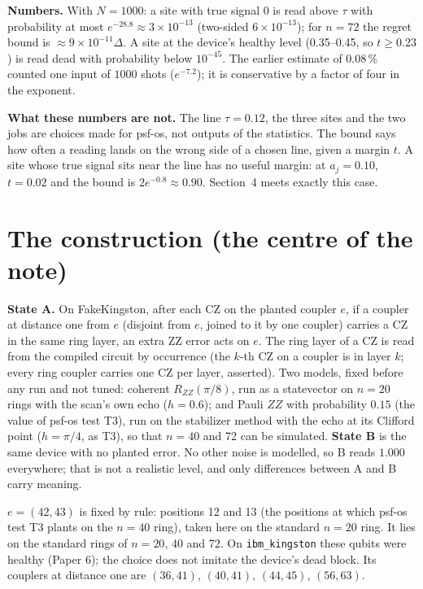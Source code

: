 \documentclass[10pt,a4paper]{article}
\theoremstyle{definition}
\theoremstyle{remark}
\begin{document}
\textbf{Numbers.} With $N=1000$: a site with true signal $0$ is read above $\tau$ with probability at most
$e^{-28.8}\approx3\times10^{-13}$ (two-sided $6\times10^{-13}$); for $n=72$ the regret bound is
$\approx9\times10^{-11}\Delta$. A site at the device's healthy level (0.35--0.45, so $t\ge0.23$) is read dead with
probability below $10^{-45}$. The earlier estimate of $0.08\,\%$ counted one input of $1000$ shots ($e^{-7.2}$); it is
conservative by a factor of four in the exponent.

\textbf{What these numbers are not.} The line $\tau=0.12$, the three sites and the two jobs are choices made for
psf-os, not outputs of the statistics. The bound says how often a reading lands on the wrong side of a chosen line,
given a margin $t$. A site whose true signal sits near the line has no useful margin: at $a_j=0.10$, $t=0.02$ and the
bound is $2e^{-0.8}\approx0.90$. Section~4 meets exactly this case.

\section{The construction (the centre of the note)}

\textbf{State A.} On FakeKingston, after each CZ on the planted coupler $e$, if a coupler at distance one from $e$
(disjoint from $e$, joined to it by one coupler) carries a CZ in the same ring layer, an extra ZZ error acts on $e$.
The ring layer of a CZ is read from the compiled circuit by occurrence (the $k$-th CZ on a coupler is in layer $k$;
every ring coupler carries one CZ per layer, asserted). Two models, fixed before any run and not tuned: coherent
$R_{ZZ}(\pi/8)$, run as a statevector on $n=20$ rings with the scan's own echo ($h=0.6$); and Pauli $ZZ$ with
probability $0.15$ (the value of psf-os test T3), run on the stabilizer method with the echo at its Clifford point
($h=\pi/4$, as T3), so that $n=40$ and 72 can be simulated. \textbf{State B} is the same device with no planted error.
No other noise is modelled, so B reads $1.000$ everywhere; that is not a realistic level, and only differences between
A and B carry meaning.

$e=(42,43)$ is fixed by rule: positions 12 and 13 (the positions at which psf-os test T3 plants on the $n=40$ ring), taken here on the standard $n=20$ ring. It lies on the
standard rings of $n=20$, 40 and 72. On \texttt{ibm\_kingston} these qubits were healthy (Paper 6); the choice does not
imitate the device's dead block. Its couplers at distance one are $(36,41)$, $(40,41)$, $(44,45)$, $(56,63)$.
\end{document}
